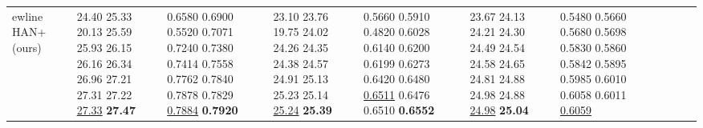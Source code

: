 \documentclass[runningheads]{llncs}
\begin{document}
\begin{table}[!ht]
\begin{tabular}{|p{7em}|p{2.5em}|p{2.5em}|p{3em}|p{2.5em}|p{3em}|p{2.5em}|p{3em}|p{2.5em}|p{3em}|p{2.5em}|p{3em}|}
ewline{} HAN+(ours) &
		 \newline{} \newline{} \newline{} \newline{} \newline{} \newline{} \newline{} \newline{} \newline{} \newline{} \newline{} \newline{} \newline{}  & 24.40 \newline{}25.33 \newline{}20.13 \newline{}25.59 \newline{}25.93 \newline{}26.15 \newline{}26.16 \newline{}26.34 \newline{}26.96 \newline{}27.21 \newline{}27.31 \newline{}27.22 \newline{}\underline{27.33} \newline{}\bfseries{27.47}& 0.6580 \newline{}0.6900 \newline{}0.5520 \newline{}0.7071 \newline{}0.7240 \newline{}0.7380 \newline{}0.7414 \newline{}0.7558 \newline{}0.7762 \newline{}0.7840 \newline{}0.7878 \newline{}0.7829 \newline{}\underline{0.7884} \newline{}\bfseries{0.7920} & 23.10 \newline{}23.76 \newline{}19.75 \newline{}24.02 \newline{}24.26 \newline{}24.35 \newline{}24.38 \newline{}24.57 \newline{}24.91 \newline{}25.13 \newline{}25.23 \newline{}25.14 \newline{}\underline{25.24} \newline{}\bfseries{25.39} & 0.5660 \newline{}0.5910 \newline{}0.4820 \newline{}0.6028 \newline{}0.6140 \newline{}0.6200 \newline{}0.6199 \newline{}0.6273 \newline{}0.6420 \newline{}0.6480 \newline{}\underline{0.6511} \newline{}0.6476 \newline{}0.6510 \newline{}\bfseries{0.6552} & 23.67 \newline{}24.13 \newline{}24.21 \newline{}24.30 \newline{}24.49 \newline{}24.54 \newline{}24.58 \newline{}24.65 \newline{}24.81 \newline{}24.88 \newline{}24.98 \newline{}24.88 \newline{}\underline{24.98} \newline{}\bfseries{25.04} & 0.5480 \newline{}0.5660 \newline{}0.5680 \newline{}0.5698 \newline{}0.5830 \newline{}0.5860 \newline{}0.5842 \newline{}0.5895 \newline{}0.5985 \newline{}0.6010 \newline{}0.6058 \newline{}0.6011 \newline{}\underline{0.6059} \newline{}\bfseri
\end{tabular}
\end{table}
\end{document}
